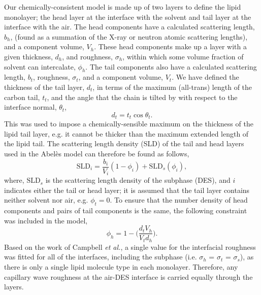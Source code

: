 \documentclass[twoside,twocolumn,9pt]{article}
\begin{document}
Our chemically-consistent model is made up of two layers to define the lipid monolayer; the head layer at the interface with the solvent and tail layer at the interface with the air. The head components have a calculated scattering length, $b_h$, (found as a summation of the X-ray or neutron atomic scattering lengths), and a component volume, $V_h$. These head components make up a layer with a given thickness, $d_h$, and roughness, $\sigma_h$, within which some volume fraction of solvent can intercalate, $\phi_h$. The tail components also have a calculated scattering length, $b_t$, roughness, $\sigma_t$, and a component volume, $V_t$. We have defined the thickness of the tail layer, $d_t$, in terms of the maximum (all-trans) length of the carbon tail, $t_t$, and the angle that the chain is tilted by with respect to the interface normal, $\theta_t$,
%
\begin{equation}
\label{equ:tl}
d_t = t_t \cos{\theta_t}.
\end{equation}
%
This was used to impose a chemically-sensible maximum on the thickness of the lipid tail layer, e.g. it cannot be thicker than the maximum extended length of the lipid tail. The scattering length density (SLD) of the tail and head layers used in the Abel\`{e}s model can therefore be found as follows,
%
\begin{equation}
\text{SLD}_i = \frac{b_i}{V_i}(1 - \phi_i) + \text{SLD}_{s}(\phi_i),
\end{equation}
%
where, $\text{SLD}_{s}$ is the scattering length density of the subphase (DES), and $i$ indicates either the tail or head layer; it is assumed that the tail layer contains neither solvent nor air, e.g. $\phi_t = 0$. To ensure that the number density of head components and pairs of tail components is the same, the following constraint was included in the model,\cite{Braun2017}
%
\begin{equation}
\label{equ:phih}
\phi_h =  1 - \bigg(\frac{d_tV_h}{V_td_h}\bigg).
\end{equation}
%
Based on the work of Campbell \emph{et al.},\cite{Campbell2018} a single value for the interfacial roughness was fitted for all of the interfaces, including the subphase (i.e. $\sigma_h$ = $\sigma_t$ = $\sigma_s$), as there is only a single lipid molecule type in each monolayer. Therefore, any capillary wave roughness at the air-DES interface is carried equally through the layers.
\end{document}
